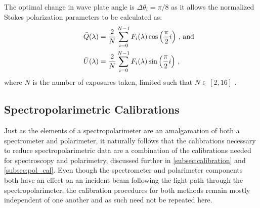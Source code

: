 The optimal change in wave plate angle is $\Delta\theta_{i} = \pi/8$ as it allows the normalized Stokes polarization parameters to be calculated as:
\begin{equation} \label{eq:specpol_Stokes_sol}
    \begin{aligned}
        \bar{Q}(\lambda) &= \frac{2}{N} \sum_{i = 0}^{N - 1} F_{i}(\lambda) \cos\left(\frac{\pi}{2} i\right) \rlap{\,,\ and}\\
        \bar{U}(\lambda) &= \frac{2}{N} \sum_{i = 0}^{N - 1} F_{i}(\lambda) \sin\left(\frac{\pi}{2} i\right)\,,
    \end{aligned}
\end{equation}
where $N$ is the number of exposures taken, limited such that $N \in [2, 16]$ \citep{polarimetry_error}.


\subsection{Spectropolarimetric Calibrations} \label{subsec:specpol_cal}

Just as the elements of a spectropolarimeter are an amalgamation of both a spectrometer and polarimeter, it naturally follows that the calibrations necessary to reduce spectropolarimetric data are a combination of the calibrations needed for spectroscopy and polarimetry, discussed further in \autoref{subsec:calibration} and \autoref{subsec:pol_cal}. Even though the spectrometer and polarimeter components both have an effect on an incident beam following the light-path through the spectropolarimeter, the calibration procedures for both methods remain mostly independent of one another and as such need not be repeated here.


